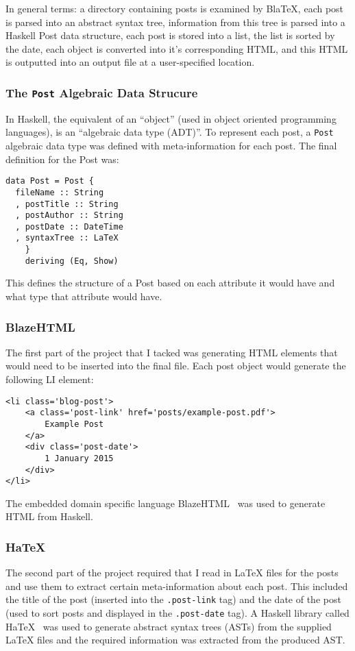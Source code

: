 
  In general terms: a directory containing posts is examined by BlaTeX, each post is parsed into an abstract syntax tree, information from this tree is parsed into a Haskell Post data structure, each post is stored into a list, the list is sorted by the date, each object is converted into it's corresponding HTML, and this HTML is outputted into an output file at a user-specified location. 

  \subsubsection{The \texttt{Post} Algebraic Data Strucure}

    In Haskell, the equivalent of an ``object'' (used in object oriented programming languages), is an ``algebraic data type (ADT)''. To represent each post, a \texttt{Post} algebraic data type was defined with meta-information for each post. The final definition for the Post was:

    \begin{verbatim}
data Post = Post {
  fileName :: String
  , postTitle :: String
  , postAuthor :: String
  , postDate :: DateTime
  , syntaxTree :: LaTeX
    }
    deriving (Eq, Show)
    \end{verbatim}

  This defines the structure of a Post based on each attribute it would have and what type that attribute would have.

  \subsubsection{BlazeHTML}
    The first part of the project that I tacked was generating HTML elements that would need to be inserted into the final file. Each post object would generate the following LI element:

  \begin{verbatim}
<li class='blog-post'>
    <a class='post-link' href='posts/example-post.pdf'>
        Example Post
    </a>
    <div class='post-date'>
        1 January 2015
    </div>
</li>
  \end{verbatim}

  The embedded domain specific language BlazeHTML~\cite{blazehtml} was used to generate HTML from Haskell. 

  \subsubsection{HaTeX}
    The second part of the project required that I read in LaTeX files for the posts and use them to extract certain meta-information about each post. This included the title of the post (inserted into the \texttt{.post-link} tag) and the date of the post (used to sort posts and displayed in the \texttt{.post-date} tag). A Haskell library called HaTeX~\cite{hatex} was used to generate abstract syntax trees (ASTs) from the supplied LaTeX files and the required information was extracted from the produced AST. 

